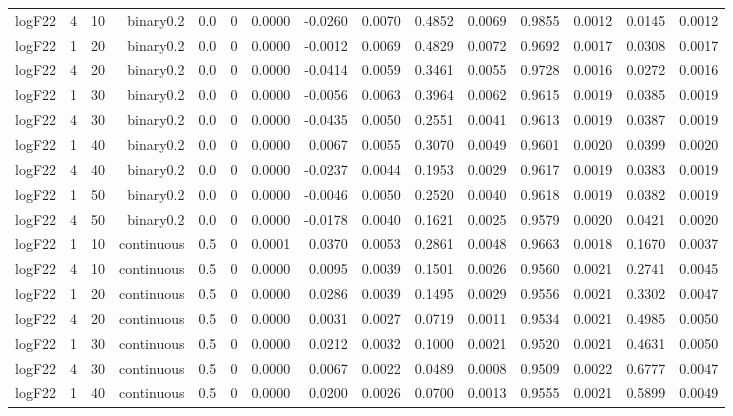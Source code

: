 \begin{longtable}{rrrrrrrrrrrrrrr}
  logF22 & 4 & 10 & binary0.2 & 0.0 & 0 & 0.0000 & -0.0260 & 0.0070 & 0.4852 & 0.0069 & 0.9855 & 0.0012 & 0.0145 & 0.0012 \\ 
  logF22 & 1 & 20 & binary0.2 & 0.0 & 0 & 0.0000 & -0.0012 & 0.0069 & 0.4829 & 0.0072 & 0.9692 & 0.0017 & 0.0308 & 0.0017 \\ 
  logF22 & 4 & 20 & binary0.2 & 0.0 & 0 & 0.0000 & -0.0414 & 0.0059 & 0.3461 & 0.0055 & 0.9728 & 0.0016 & 0.0272 & 0.0016 \\ 
  logF22 & 1 & 30 & binary0.2 & 0.0 & 0 & 0.0000 & -0.0056 & 0.0063 & 0.3964 & 0.0062 & 0.9615 & 0.0019 & 0.0385 & 0.0019 \\ 
  logF22 & 4 & 30 & binary0.2 & 0.0 & 0 & 0.0000 & -0.0435 & 0.0050 & 0.2551 & 0.0041 & 0.9613 & 0.0019 & 0.0387 & 0.0019 \\ 
  logF22 & 1 & 40 & binary0.2 & 0.0 & 0 & 0.0000 & 0.0067 & 0.0055 & 0.3070 & 0.0049 & 0.9601 & 0.0020 & 0.0399 & 0.0020 \\ 
  logF22 & 4 & 40 & binary0.2 & 0.0 & 0 & 0.0000 & -0.0237 & 0.0044 & 0.1953 & 0.0029 & 0.9617 & 0.0019 & 0.0383 & 0.0019 \\ 
  logF22 & 1 & 50 & binary0.2 & 0.0 & 0 & 0.0000 & -0.0046 & 0.0050 & 0.2520 & 0.0040 & 0.9618 & 0.0019 & 0.0382 & 0.0019 \\ 
  logF22 & 4 & 50 & binary0.2 & 0.0 & 0 & 0.0000 & -0.0178 & 0.0040 & 0.1621 & 0.0025 & 0.9579 & 0.0020 & 0.0421 & 0.0020 \\ 
  logF22 & 1 & 10 & continuous & 0.5 & 0 & 0.0001 & 0.0370 & 0.0053 & 0.2861 & 0.0048 & 0.9663 & 0.0018 & 0.1670 & 0.0037 \\ 
  logF22 & 4 & 10 & continuous & 0.5 & 0 & 0.0000 & 0.0095 & 0.0039 & 0.1501 & 0.0026 & 0.9560 & 0.0021 & 0.2741 & 0.0045 \\ 
  logF22 & 1 & 20 & continuous & 0.5 & 0 & 0.0000 & 0.0286 & 0.0039 & 0.1495 & 0.0029 & 0.9556 & 0.0021 & 0.3302 & 0.0047 \\ 
  logF22 & 4 & 20 & continuous & 0.5 & 0 & 0.0000 & 0.0031 & 0.0027 & 0.0719 & 0.0011 & 0.9534 & 0.0021 & 0.4985 & 0.0050 \\ 
  logF22 & 1 & 30 & continuous & 0.5 & 0 & 0.0000 & 0.0212 & 0.0032 & 0.1000 & 0.0021 & 0.9520 & 0.0021 & 0.4631 & 0.0050 \\ 
  logF22 & 4 & 30 & continuous & 0.5 & 0 & 0.0000 & 0.0067 & 0.0022 & 0.0489 & 0.0008 & 0.9509 & 0.0022 & 0.6777 & 0.0047 \\ 
  logF22 & 1 & 40 & continuous & 0.5 & 0 & 0.0000 & 0.0200 & 0.0026 & 0.0700 & 0.0013 & 0.9555 & 0.0021 & 0.5899 & 0.0049 \\ 

\end{longtable}
